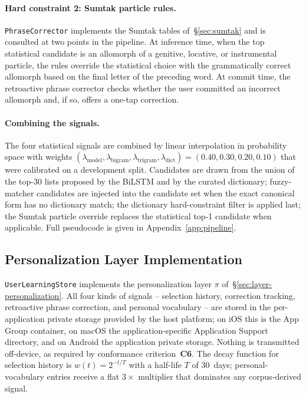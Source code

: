 \documentclass[11pt]{article}
\begin{document}
\paragraph{Hard constraint 2: Sumtak particle rules.}
\texttt{PhraseCorrector} implements the Sumtak tables of~\S\ref{sec:sumtak} and is consulted at two points in the pipeline. At inference time, when the top statistical candidate is an allomorph of a genitive, locative, or instrumental particle, the rules override the statistical choice with the grammatically correct allomorph based on the final letter of the preceding word. At commit time, the retroactive phrase corrector checks whether the user committed an incorrect allomorph and, if so, offers a one-tap correction.

\paragraph{Combining the signals.}
The four statistical signals are combined by linear interpolation in probability space with weights $(\lambda_{\text{model}}, \lambda_{\text{bigram}}, \lambda_{\text{trigram}}, \lambda_{\text{dict}}) = (0.40, 0.30, 0.20, 0.10)$ that were calibrated on a development split. Candidates are drawn from the union of the top-30 lists proposed by the BiLSTM and by the curated dictionary; fuzzy-matcher candidates are injected into the candidate set when the exact canonical form has no dictionary match; the dictionary hard-constraint filter is applied last; the Sumtak particle override replaces the statistical top-1 candidate when applicable. Full pseudocode is given in Appendix~\ref{app:pipeline}.

\subsection{Personalization Layer Implementation}
\label{sec:arch-personalization}

\texttt{UserLearningStore} implements the personalization layer $\pi$ of~\S\ref{sec:layer-personalization}. All four kinds of signals -- selection history, correction tracking, retroactive phrase correction, and personal vocabulary -- are stored in the per-application private storage provided by the host platform; on iOS this is the App Group container, on macOS the application-specific Application Support directory, and on Android the application private storage. Nothing is transmitted off-device, as required by conformance criterion~\textbf{C6}. The decay function for selection history is $w(t) = 2^{-t/T}$ with a half-life $T$ of 30~days; personal-vocabulary entries receive a flat $3\times$ multiplier that dominates any corpus-derived signal.
\end{document}
